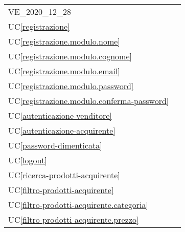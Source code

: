 \begin{longtable}{C{6cm} C{6cm}}
	VE\_2020\_12\_28 &  \newline {}  \\

	UC\ref{registrazione} &  \\

	UC\ref{registrazione.modulo.nome} &  \\

    UC\ref{registrazione.modulo.cognome} &  \\

	UC\ref{registrazione.modulo.email} &  \\

    UC\ref{registrazione.modulo.password} &  \\

	UC\ref{registrazione.modulo.conferma-password} &  \\

    UC\ref{autenticazione-venditore} &  \\

	UC\ref{autenticazione-acquirente} &  \\

    UC\ref{password-dimenticata} &  \\

	UC\ref{logout} &  \\

    UC\ref{ricerca-prodotti-acquirente} &  \\

	UC\ref{filtro-prodotti-acquirente} &  \\

    UC\ref{filtro-prodotti-acquirente.categoria} &  \\

	UC\ref{filtro-prodotti-acquirente.prezzo} &  \\


\end{longtable}
